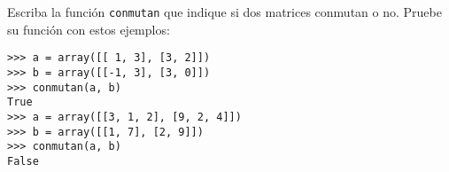 \begin{enumerate}
  Escriba la función \lstinline!conmutan! que indique si dos matrices
  conmutan o no. Pruebe su función con estos ejemplos:
\begin{lstlisting}
>>> a = array([[ 1, 3], [3, 2]])
>>> b = array([[-1, 3], [3, 0]])
>>> conmutan(a, b)
True
>>> a = array([[3, 1, 2], [9, 2, 4]])
>>> b = array([[1, 7], [2, 9]])
>>> conmutan(a, b)
False
\end{lstlisting}
\end{enumerate}
